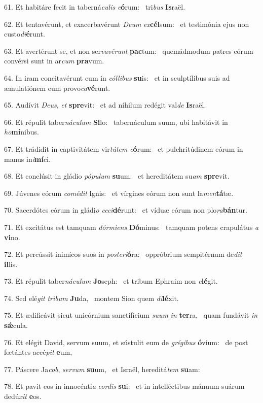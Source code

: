 61. Et habitáre fecit in taberná\textit{cu}\textit{lis} \textit{e}\textbf{ó}rum: \ast\  tri\textit{bus} \textbf{Is}raël.\

62. Et tentavérunt, et exacerbavérunt \textit{De}\textit{um} \textit{ex}\textbf{cél}sum: \ast\  et testimónia ejus non custo\textit{di}\textbf{é}runt.\

63. Et avertérunt se, et non ser\textit{va}\textit{vé}\textit{runt} \textbf{pac}tum: \ast\  quemádmodum patres eórum convérsi sunt in ar\textit{cum} \textbf{pra}vum.\

64. In iram concitavérunt eum in \textit{cól}\textit{li}\textit{bus} \textbf{su}is: \ast\  et in sculptílibus suis ad æmulatiónem eum provo\textit{ca}\textbf{vé}runt.\

65. Audívit \textit{De}\textit{us}, \textit{et} \textbf{spre}vit: \ast\  et ad níhilum redégit val\textit{de} \textbf{Is}raël.\

66. Et répulit taber\textit{ná}\textit{cu}\textit{lum} \textbf{Si}lo: \ast\  tabernáculum suum, ubi habitávit in \textit{ho}\textbf{mí}nibus.\

67. Et trádidit in captivitátem vir\textit{tú}\textit{tem} \textit{e}\textbf{ó}rum: \ast\  et pulchritúdinem eórum in manus in\textit{i}\textbf{mí}ci.\

68. Et conclúsit in gládio \textit{pó}\textit{pu}\textit{lum} \textbf{su}um: \ast\  et hereditátem su\textit{am} \textbf{spre}vit.\

69. Júvenes eórum \textit{com}\textit{é}\textit{dit} \textbf{i}gnis: \ast\  et vírgines eórum non sunt la\textit{men}\textbf{tá}tæ.\

70. Sacerdótes eórum in gládi\textit{o} \textit{ce}\textit{ci}\textbf{dé}runt: \ast\  et víduæ eórum non plo\textit{ra}\textbf{bán}tur.\

71. Et excitátus est tamquam \textit{dór}\textit{mi}\textit{ens} \textbf{Dó}minus: \ast\  tamquam potens crapulátus \textit{a} \textbf{vi}no.\

72. Et percússit inimícos suos in \textit{post}\textit{e}\textit{ri}\textbf{ó}ra: \ast\  oppróbrium sempitérnum de\textit{dit} \textbf{il}lis.\

73. Et répulit taber\textit{ná}\textit{cu}\textit{lum} \textbf{Jo}seph: \ast\  et tribum Ephraim non \textit{e}\textbf{lé}git.\

74. Sed elé\textit{git} \textit{tri}\textit{bum} \textbf{Ju}da, \ast\  montem Sion quem \textit{di}\textbf{lé}xit.\

75. Et ædificávit sicut unicórnium sanctifícium \textit{su}\textit{um} \textit{in} \textbf{ter}ra, \ast\  quam fundávit \textit{in} \textbf{sǽ}cula.\

76. Et elégit David, servum suum, et sústulit eum de \textit{gré}\textit{gi}\textit{bus} \textbf{ó}vium: \ast\  de post fœtántes accé\textit{pit} \textbf{e}um,\

77. Páscere Ja\textit{cob}, \textit{ser}\textit{vum} \textbf{su}um, \ast\  et Israël, hereditá\textit{tem} \textbf{su}am:\

78. Et pavit eos in innocénti\textit{a} \textit{cor}\textit{dis} \textbf{su}i: \ast\  et in intelléctibus mánuum suárum dedú\textit{xit} \textbf{e}os.\

